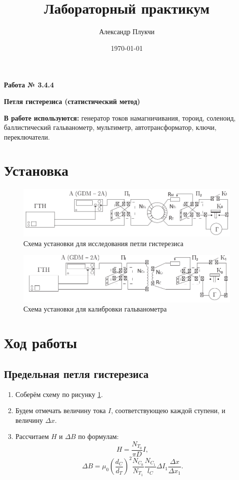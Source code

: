 \documentclass[a4paper,12pt]{article}
\author{Александр Плукчи}
\title{Лабораторный практикум}
\date{\today}
\begin{document}
	\textbf{Работа № 3.4.4}
	
	\textbf{\Large{Петля гистерезиса (статистический метод)}}
	
	\textbf{В работе используются:} генератор токов намагничивания, тороид, соленоид, баллистический гальванометр, мультиметр, автотрансформатор, ключи, переключатели.
	\section*{Установка}
		\begin{figure}[H]
			\caption{Схема установки для исследования петли гистерезиса}
			\label{inst1}
			\includegraphics[scale = 1]{inst1.pdf}
		\end{figure}
		\begin{figure}[H]
			\caption{Схема установки для калибровки гальванометра}
			\label{inst2}
			\includegraphics[scale = 1]{inst2.pdf}
		\end{figure}
	\section*{Ход работы}
		\subsection*{Предельная петля гистерезиса}
			\begin{enumerate}
				\item Соберём схему по рисунку \ref{inst1}.
				\item Будем отмечать величину тока $ I $, соответствующею каждой ступени, и величину $ \Delta x $.
				\item Рассчитаем $ H $ и $ \Delta B $ по формулам:
				\begin{equation}\label{eq:1}
					H = \frac{N_{T_0}}{\pi D} I,
				\end{equation}
				\begin{equation}\label{eq:2}
					\Delta B = \mu_0 \left(\frac{d_C}{d_T}\right)^2 \frac{N_{C_0}}{N_{T_1}} \frac{N_{C_1}}{l_C} \Delta I_1 \frac{\Delta x}{\Delta x_1}.
				\end{equation}
			\end{enumerate}
\end{document}
